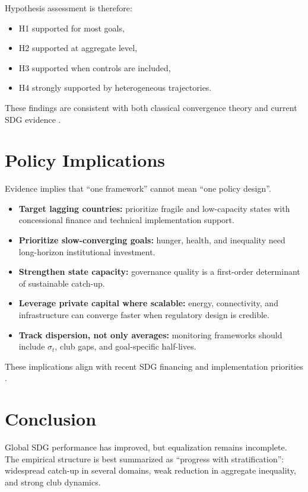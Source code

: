 Hypothesis assessment is therefore:
\begin{itemize}
    \item H1 supported for most goals,
    \item H2 supported at aggregate level,
    \item H3 supported when controls are included,
    \item H4 strongly supported by heterogeneous trajectories.
\end{itemize}
These findings are consistent with both classical convergence theory and current SDG evidence \citep{barro1992,salaimartin1996,bigerna2025,phillips2007}.

\chapter{Policy Implications}
Evidence implies that ``one framework'' cannot mean ``one policy design''.
\begin{itemize}
    \item \textbf{Target lagging countries:} prioritize fragile and low-capacity states with concessional finance and technical implementation support.
    \item \textbf{Prioritize slow-converging goals:} hunger, health, and inequality need long-horizon institutional investment.
    \item \textbf{Strengthen state capacity:} governance quality is a first-order determinant of sustainable catch-up.
    \item \textbf{Leverage private capital where scalable:} energy, connectivity, and infrastructure can converge faster when regulatory design is credible.
    \item \textbf{Track dispersion, not only averages:} monitoring frameworks should include $\sigma_t$, club gaps, and goal-specific half-lives.
\end{itemize}
These implications align with recent SDG financing and implementation priorities \citep{sachs2025,sdsn2022}.

\chapter{Conclusion}
Global SDG performance has improved, but equalization remains incomplete. The empirical structure is best summarized as ``progress with stratification'': widespread catch-up in several domains, weak reduction in aggregate inequality, and strong club dynamics.

